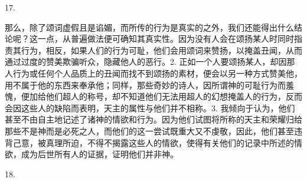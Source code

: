 17. \par

那么，除了颂词虚假且是谄媚，而所传的行为是真实的之外，我们还能得出什么结论呢？这一点，从普遍做法便可确知其真实性。因为没有人会在颂扬某人时同时指责其行为，相反，如果人们的行为可耻，他们会用颂词来赞扬，以掩盖丑闻，从而通过过度的赞美欺骗听众，隐藏他人的恶行。2. 正如一个人要颂扬某人，却因那人行为或任何个人品质上的丑闻而找不到颂扬的素材，便会以另一种方式赞美他，用不属于他的东西来奉承他；同样，那些奇妙的诗人，因所谓神的可耻行为而羞愧，便加给他们超人的称号，却不知道他们无法用超人的幻想掩盖人的行为，反而会因这些人的缺陷而表明，天主的属性与他们并不相称。3. 我倾向于认为，他们甚至不由自主地记述了诸神的情欲和行为。因为他们试图将所称的天主和荣耀归给那些不是神而是必死之人，而他们的这一尝试既重大又不虔敬，因此，他们甚至违背己意，被真理所迫，不得不揭露这些人的情欲，使得有关他们的记录中所述的情欲，成为后世所有人的证据，证明他们并非神。\par

18. \par

